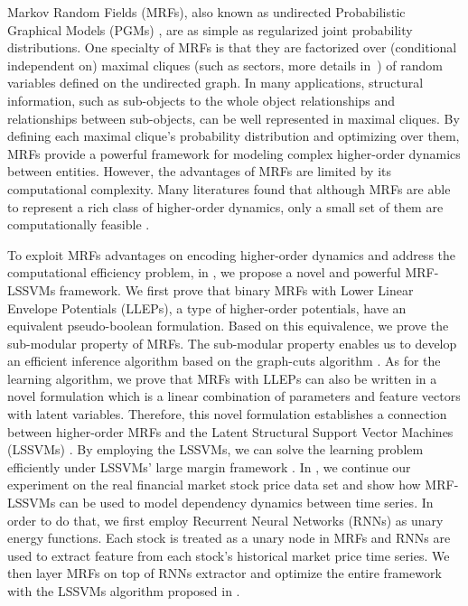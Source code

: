 Markov Random Fields (MRFs), also known as undirected
Probabilistic Graphical Models (PGMs) \cite{bishop:2006:PRML},
are as simple as regularized joint probability distributions. One
specialty of MRFs is that they are factorized over (conditional
independent on) maximal cliques (such as sectors, more details
in~) of random variables defined on the
undirected graph. In many applications, structural information,
such as sub-objects to the whole object relationships and
relationships between sub-objects, can be well represented in
maximal cliques. By defining each maximal clique's probability
distribution and optimizing over them, MRFs provide a powerful
framework for modeling complex higher-order dynamics between
entities. However, the advantages of MRFs are limited by its
computational complexity. Many literatures
\cite{Kohli:TR08,pletscher2012learning,Ladicky:ECCV10,Szummer:ECCV08}
found that although MRFs are able to represent a rich class of
higher-order dynamics, only a small set of them are
computationally feasible \cite{gouldlearning,Park:ECCV2012}.

To exploit MRFs advantages on encoding higher-order dynamics and
address the computational efficiency problem, in
, we propose a novel and powerful MRF-LSSVMs
framework. We first prove that binary MRFs with Lower Linear
Envelope Potentials (LLEPs), a type of higher-order potentials,
have an equivalent pseudo-boolean \cite{Boros:MATH02}
formulation. Based on this equivalence, we prove the sub-modular
property of MRFs. The sub-modular property enables us to develop
an efficient inference algorithm based on the graph-cuts
algorithm \cite{Kolmogorov:PAMI04}. As for the learning
algorithm, we prove that MRFs with LLEPs can also be written in a
novel formulation which is a linear combination of parameters and
feature vectors with latent variables. Therefore, this novel
formulation establishes a connection between higher-order MRFs
and the Latent Structural Support Vector Machines (LSSVMs)
\cite{yu2009learning}. By employing the LSSVMs, we can solve the
learning problem efficiently under LSSVMs' large margin framework
\cite{tsochantaridis2005large}. In ,
we continue our experiment on the real financial market stock
price data set and show how MRF-LSSVMs can be used to model
dependency dynamics between time series. In order to do that, we
first employ Recurrent Neural Networks (RNNs) as unary energy
functions. Each stock is treated as a unary node in MRFs and RNNs
are used to extract feature from each stock's historical market
price time series. We then layer MRFs on top of RNNs extractor
and optimize the entire framework with the LSSVMs algorithm
proposed in .

